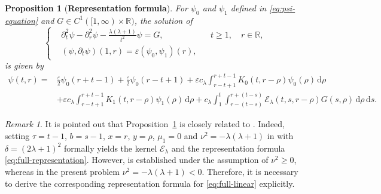 \documentclass[11pt,twoside]{article}
\newcommand{\R}{\mathbb R}
\newcommand{\p}{\partial}
\newcommand{\ve}{\varepsilon}
\newcommand{\f}{\frac}
\newcommand{\dd}{\,\mathrm{d}}
\newcommand{\Ecal}{\mathcal E}
\theoremstyle{plain}
\newtheorem{proposition}{Proposition}[section]
\theoremstyle{definition}
\theoremstyle{remark}
\newtheorem{remark}{Remark}[section]
\numberwithin{equation}{section}
\begin{document}
\begin{proposition}[{\bf Representation formula}]
\label{prop:full-representation}
For $\psi_0$ and $\psi_1$ defined in \eqref{eq:psi-equation} and
$G\in C^1([1,\infty)\times\R)$, the solution of
\begin{equation}
\label{eq:full-linear}
\left\{
\begin{aligned}
&\p_t^2\psi-\p_r^2\psi-\f{\lambda(\lambda+1)}{t^2}\psi=G,
&&t\geq1,\quad r\in\R,\\
&(\psi,\p_t\psi)(1,r)=\ve(\psi_0,\psi_1)(r),
\end{aligned}
\right.
\end{equation}
is given by
\begin{equation}
\label{eq:full-representation}
\begin{aligned}
\psi(t,r)
={}&\f{\ve}{2}\psi_0(r+t-1)
+\f{\ve}{2}\psi_0(r-t+1)
+\ve c_\lambda\int_{r-t+1}^{r+t-1}
K_0(t,r-\rho)\psi_0(\rho)\dd\rho\\
&+\ve c_\lambda\int_{r-t+1}^{r+t-1}
K_1(t,r-\rho)\psi_1(\rho)\dd\rho
+c_\lambda\int_1^t\int_{r-(t-s)}^{r+(t-s)}
\Ecal_\lambda(t,s,r-\rho)G(s,\rho)\dd\rho\dd s.
\end{aligned}
\end{equation}
\end{proposition}
\begin{remark}
It is pointed out that Proposition~\ref{prop:full-representation} is closely related to
\cite[Theorem~1]{P2}. Indeed, setting $\tau=t-1$, $b=s-1$, $x=r$,
$y=\rho$, $\mu_1=0$ and $\nu^2=-\lambda(\lambda+1)$ in
\cite[Theorem~1]{P2} with $\delta=(2\lambda+1)^2$ formally yields
the kernel $\Ecal_\lambda$ and the representation formula
\eqref{eq:full-representation}.
However, \cite[Theorem~1]{P2} is established under the assumption of
$\nu^2\geq0$, whereas in the present problem
$\nu^2=-\lambda(\lambda+1)<0$. Therefore, it is necessary to derive
the corresponding representation formula for \eqref{eq:full-linear} explicitly.
\end{remark}
\end{document}
